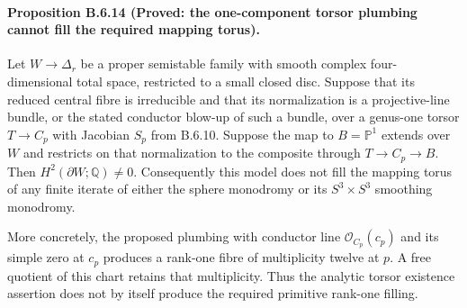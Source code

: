 \paragraph{Proposition B.6.14 (Proved: the one-component torsor plumbing cannot fill the required mapping torus).}
Let $W\to\Delta_r$ be a proper semistable family with smooth
complex four-dimensional total space, restricted to a small closed
disc.  Suppose that its reduced central fibre is irreducible and
that its normalization is a projective-line bundle, or the stated
conductor blow-up of such a bundle, over a genus-one torsor
$T\to C_p$ with Jacobian $S_p$ from B.6.10.  Suppose the map to
$B=\mathbb P^1$ extends over $W$ and restricts on that normalization
to the composite through $T\to C_p\to B$.
Then $H^2(\partial W;\mathbb Q)\ne0$.
Consequently this model does not fill the mapping torus of any
finite iterate of either the sphere monodromy or its
$S^3\times S^3$ smoothing monodromy.

More concretely, the proposed plumbing with conductor line
$\mathcal O_{C_p}(c_p)$ and its simple zero at $c_p$ produces
a rank-one fibre of multiplicity twelve at $p$.  A free quotient
of this chart retains that multiplicity.  Thus the analytic
torsor existence assertion does not by itself produce the
required primitive rank-one filling.

